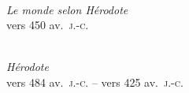 \noindent\begin{minipage}[t][\textheight][s]{\textwidth}
\vfill
\begin{center}

  \begin{minipage}[t]{\textwidth}
    \centering
    \\[-0.4em]
    {\figcaptionname\itshape Le monde selon Hérodote}\\[-0.4em]
    {\figcaptiondetail vers 450 av.~\textsc{j.-c.}}
  \end{minipage}

\end{center}
\vspace{\baselineskip}
\begin{center}

  \begin{minipage}[t]{0.8\textwidth}
    \centering
    \\[-0.4em]
    {\figcaptionname\itshape Hérodote}\\[-0.4em]
    {\figcaptiondetail vers 484 av.~\textsc{j.-c.} -- vers 425 av.~\textsc{j.-c.}}
  \end{minipage}

\end{center}
\vfill
\end{minipage}
